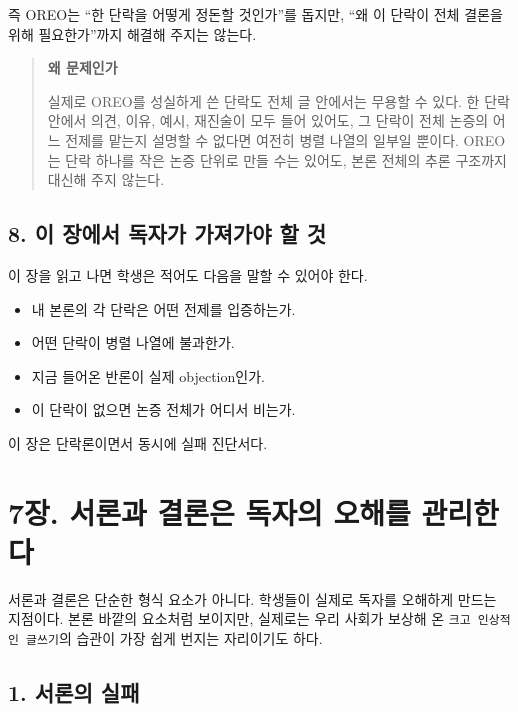 즉 OREO는 ``한 단락을 어떻게 정돈할 것인가''를 돕지만, ``왜 이 단락이 전체 결론을 위해 필요한가''까지 해결해 주지는 않는다.

\begin{quote}
\textbf{왜 문제인가}

실제로 OREO를 성실하게 쓴 단락도 전체 글 안에서는 무용할 수 있다. 한 단락 안에서 의견, 이유, 예시, 재진술이 모두 들어 있어도, 그 단락이 전체 논증의 어느 전제를 맡는지 설명할 수 없다면 여전히 병렬 나열의 일부일 뿐이다. OREO는 단락 하나를 작은 논증 단위로 만들 수는 있어도, 본론 전체의 추론 구조까지 대신해 주지 않는다.
\end{quote}

\section{8. 이 장에서 독자가 가져가야 할 것}\label{8-uxc774-uxc7a5uxc5d0uxc11c-uxb3c5uxc790uxac00-uxac00uxc838uxac00uxc57c-uxd560-uxac83}

이 장을 읽고 나면 학생은 적어도 다음을 말할 수 있어야 한다.

\begin{itemize}
\tightlist
\item
  내 본론의 각 단락은 어떤 전제를 입증하는가.
\item
  어떤 단락이 병렬 나열에 불과한가.
\item
  지금 들어온 반론이 실제 objection인가.
\item
  이 단락이 없으면 논증 전체가 어디서 비는가.
\end{itemize}

이 장은 단락론이면서 동시에 실패 진단서다.

\chapter{7장. 서론과 결론은 독자의 오해를 관리한다}\label{7uxc7a5-uxc11cuxb860uxacfc-uxacb0uxb860uxc740-uxb3c5uxc790uxc758-uxc624uxd574uxb97c-uxad00uxb9acuxd55cuxb2e4}

서론과 결론은 단순한 형식 요소가 아니다. 학생들이 실제로 독자를 오해하게 만드는 지점이다. 본론 바깥의 요소처럼 보이지만, 실제로는 우리 사회가 보상해 온 \texttt{크고\ 인상적인\ 글쓰기}의 습관이 가장 쉽게 번지는 자리이기도 하다.

\section{1. 서론의 실패}\label{1-uxc11cuxb860uxc758-uxc2e4uxd328}

